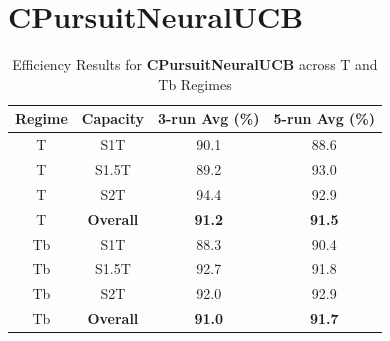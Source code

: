 \documentclass[11pt]{article}
\begin{document}
\section*{CPursuitNeuralUCB}
\begin{table}[H]
\centering
\caption{Efficiency Results for \textbf{CPursuitNeuralUCB} across T and Tb Regimes}
\begin{tabular}{|c|c|c|c|}
\hline
Regime & Capacity & 3-run Avg (\%) & 5-run Avg (\%) \\ \hline
T & S1T & 90.1 & 88.6 \\
T & S1.5T & 89.2 & 93.0 \\
T & S2T & 94.4 & 92.9 \\
T & \textbf{Overall} & \textbf{91.2} & \textbf{91.5} \\ \hline
Tb & S1T & 88.3 & 90.4 \\
Tb & S1.5T & 92.7 & 91.8 \\
Tb & S2T & 92.0 & 92.9 \\
Tb & \textbf{Overall} & \textbf{91.0} & \textbf{91.7} \\ \hline
\end{tabular}
\end{table}
\end{document}
